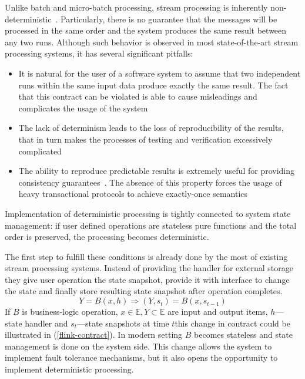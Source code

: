 
Unlike batch and micro-batch processing, stream processing is inherently non-deterministic~\cite{Zaharia:2012:DSE:2342763.2342773}. Particularly, there is no guarantee that the messages will be processed in the same order and the system produces the same result between any two runs. Although such behavior is observed in most state-of-the-art stream processing systems, it has several significant pitfalls:

\begin{itemize}
    \item It is natural for the user of a software system to assume that two independent runs within the same input data produce exactly the same result. The fact that this contract can be violated is able to cause misleadings and complicates the usage of the system
    \item The lack of determinism leads to the loss of reproducibility of the results, that in turn makes the processes of testing and verification excessively complicated
    \item The ability to reproduce predictable results is extremely useful for providing consistency guarantees~\cite{Stonebraker:2005:RRS:1107499.1107504}. The absence of this property forces the usage of heavy transactional protocols to achieve exactly-once semantics~\cite{Carbone:2017:SMA:3137765.3137777, jacques2016consistent} 
\end{itemize}

Implementation of deterministic processing is tightly connected to system state management: if user defined operations are stateless pure functions and the total order is preserved, the processing becomes deterministic.

The first step to fulfill these conditions is already done by the most of existing stream processing systems. Instead of providing the handler for external storage they give user operation the state snapshot, provide it with interface to change the state and finally store resulting state snapshot after operation completes.
\begin{equation*}
\label{flink-contract}
Y = B(x, h) \Rightarrow (Y, s_t) = B(x, s_{t-1}) 
\end{equation*}
If $B$ is business-logic operation, $x \in \mathbb{E}, Y \subset \mathbb{E}$ are input and output items, $h$---state handler and $s_t$---state snapshots at time $t$this change in contract could be illustrated in (\ref{flink-contract}). In modern setting $B$ becomes stateless and state management is done on the system side. This change allows the system to implement fault tolerance mechanisms, but it also opens the opportunity to implement deterministic processing. 


